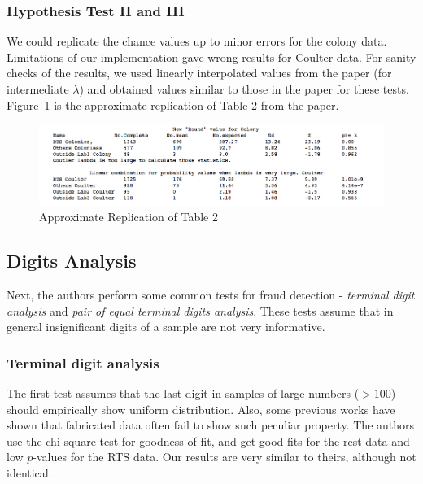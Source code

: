 \documentclass{article}
\begin{document}
    \subsubsection{Hypothesis Test II and III}\label{using-lambda-to-obtain-p-values}

We could replicate the chance values up to minor errors for the colony data. Limitations of our implementation gave wrong results for Coulter data. For sanity checks of the results, we used linearly interpolated values from the paper (for intermediate $\lambda$) and obtained values similar to those in the paper for these tests. Figure~\ref{table2} is the approximate replication of Table 2 from the paper.

\begin{figure}[H]
\centering
\includegraphics[width=0.9\linewidth]{images/HT_Stat_values.png}
\caption{Approximate Replication of Table 2}
\label{table2}
\end{figure}

    \subsection{Digits Analysis}\label{digits-analysis}

Next, the authors perform some common tests for fraud detection - \textit{terminal
digit analysis} and \textit{pair of equal terminal digits analysis}. These tests
assume that in general insignificant digits of a sample are not very informative.

\subsubsection{Terminal digit analysis}\label{terminal-digit-analysis}

The first test assumes that the last digit in samples of large numbers
($>100$) should empirically show uniform distribution. Also, some previous works
have shown that fabricated data often fail to show such peculiar property.
The authors use the chi-square test for goodness of fit, and get good fits for
the rest data and low $p$-values for the RTS data.
Our results are very similar to theirs, although not identical.
\end{document}
